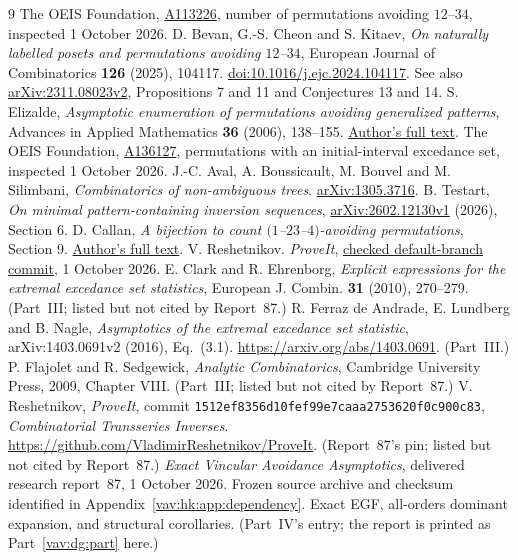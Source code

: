 \documentclass[11pt]{article}
\theoremstyle{remark}\newtheorem{remark}[theorem]{Remark}
\begin{document}
\begin{thebibliography}{9}
The OEIS Foundation, \href{https://oeis.org/A113226}{A113226},
number of permutations avoiding $12$--$34$, inspected 1 October 2026.
D. Bevan, G.-S. Cheon and S. Kitaev,
\emph{On naturally labelled posets and permutations avoiding $12$--$34$},
European Journal of Combinatorics \textbf{126} (2025), 104117.
\href{https://doi.org/10.1016/j.ejc.2024.104117}{doi:10.1016/j.ejc.2024.104117}.
See also \href{https://arxiv.org/abs/2311.08023v2}{arXiv:2311.08023v2},
Propositions 7 and 11 and Conjectures 13 and 14.
S. Elizalde, \emph{Asymptotic enumeration of permutations avoiding
generalized patterns}, Advances in Applied Mathematics \textbf{36}
(2006), 138--155.
\href{https://math.dartmouth.edu/~sergi/papers/pp05_aam_elizalde.pdf}{Author's full text}.
The OEIS Foundation, \href{https://oeis.org/A136127}{A136127},
permutations with an initial-interval excedance set, inspected
1 October 2026.
J.-C. Aval, A. Boussicault, M. Bouvel and M. Silimbani,
\emph{Combinatorics of non-ambiguous trees}.
\href{https://arxiv.org/abs/1305.3716}{arXiv:1305.3716}.
B. Testart, \emph{On minimal pattern-containing inversion sequences},
\href{https://arxiv.org/abs/2602.12130v1}{arXiv:2602.12130v1} (2026),
Section 6.
D. Callan, \emph{A bijection to count $(1$--$23$--$4)$-avoiding
permutations}, Section 9.
\href{https://pages.stat.wisc.edu/~callan/papers/1_23_4_avoid/1_23_4_avoid.pdf}{Author's full text}.
 V. Reshetnikov. \emph{ProveIt},
\href{https://github.com/VladimirReshetnikov/ProveIt/commit/63b9d68407f21832316eb296fd0885e40e033c90}{checked default-branch commit}, 1 October 2026.
 E. Clark and R. Ehrenborg,
\emph{Explicit expressions for the extremal excedance set statistics},
European J. Combin. \textbf{31} (2010), 270--279. (Part~III; listed but not
cited by Report~87.)
 R. Ferraz de Andrade, E. Lundberg and B. Nagle,
\emph{Asymptotics of the extremal excedance set statistic},
arXiv:1403.0691v2 (2016), Eq.~(3.1).
\url{https://arxiv.org/abs/1403.0691}. (Part~III.)
 P. Flajolet and R. Sedgewick,
\emph{Analytic Combinatorics}, Cambridge University Press, 2009,
Chapter VIII. (Part~III; listed but not cited by Report~87.)
 V. Reshetnikov, \emph{ProveIt},
commit \texttt{1512ef8356d10fef99e7caaa2753620f0c900c83},
\emph{Combinatorial Transseries Inverses}.
\url{https://github.com/VladimirReshetnikov/ProveIt}. (Report~87's pin;
listed but not cited by Report~87.)
\emph{Exact Vincular Avoidance Asymptotics}, delivered research report~87, 1 October 2026. Frozen source archive and checksum identified in Appendix~\ref{vav:hk:app:dependency}. Exact EGF, all-orders dominant expansion, and structural corollaries. (Part~IV's entry; the report is printed as Part~\ref{vav:dg:part} here.)
\end{thebibliography}
\end{document}
